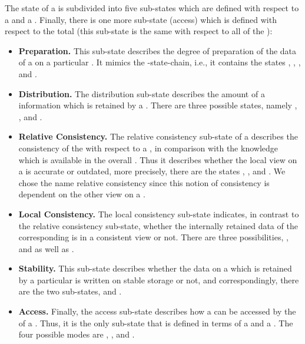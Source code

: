 \documentclass[a4paper, 12pt]{book}
\begin{document}
The state of a  is subdivided into five sub-states which
are defined with respect to a  and a . Finally, there is one more sub-state (access) which is defined
with respect to the total  (this sub-state is the same
with respect to all  of the ):
\begin{itemize}
\item \textbf{Preparation.} This sub-state describes the degree of
preparation of the data of a  on a particular
. It mimics the -state-chain, i.e.,
it contains the states \revprepstateNIL, \revprepstateUNLOADED,
\revprepstateLOADED, and \revprepstateACTIVATED.
\item \textbf{Distribution.} The distribution sub-state describes the
amount of a information which is retained by a . There are
three possible states, namely \revdiststateEMPTY,
\revdiststatePARTIAL, and \revdiststateCOMPLETE.
\item \textbf{Relative Consistency.} The relative consistency
sub-state of a  describes the consistency of the
 with respect to a , in comparison with the
knowledge which is available in the overall . Thus it
describes whether the local view on a  is accurate or
outdated, more precisely, there are the states
\revrelconstateACCURATE, \revrelconstateOUTDATED,
\revrelconstateBRANCHED and \revrelconstateUNDEFINED. We chose the
name relative consistency since this notion of consistency is
dependent on the other  view on a .
\item \textbf{Local Consistency.} The local consistency sub-state
indicates, in contrast to the relative consistency sub-state, whether
the internally retained data of the corresponding  is in a
consistent view or not. There are three possibilities,
\revabsconstateCONSISTENT, and \revabsconstateINCONSISTENT as well as
\revabsconstateUNDEFINED.
\item \textbf{Stability.} This sub-state describes whether the data on
a  which is retained by a particular  is
written on stable storage or not, and correspondingly, there are the
two sub-states, \revstablestorageSTABLE and \revstablestorageUNSTABLE.
\item \textbf{Access.} Finally, the access sub-state describes how a
 can be accessed by the  of a . Thus, it is the only sub-state that is defined in terms of a
 and a . The four possible modes are
\revaccessstateUNACCESSIBLE, \revaccessstateCLOSED,
\revaccessstateREADABLE and \revaccessstateWRITABLE.
\end{itemize}
\end{document}
